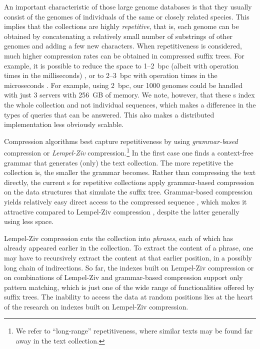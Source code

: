 An important characteristic of those large genome databases is that they
usually consist of the genomes of individuals of the same or closely related
species. This implies that the collections are highly \emph{repetitive}, that
is, each genome can be obtained by concatenating a relatively small number of
substrings of other genomes
and adding a few new characters. When repetitiveness is considered, much higher
compression rates can be obtained in compressed suffix trees. For example, it is possible to reduce
the space to 1--2~bpc (albeit with operation times in the milliseconds)
\cite{Abeliuk2013}, or to 2--3~bpc with operation times in the microseconds
\cite{Navarro2015}. For example, using 2~bpc, our 1000 genomes could be handled
with just 3 servers with 256~GB of memory. We note, however, that these \CST{}s index
the whole collection and not individual sequences, which makes a difference in
the types of queries that can be answered. This also makes a distributed
implementation less obviously scalable.

Compression algorithms best capture repetitiveness by using \emph{grammar-based}
compression or \emph{Lempel-Ziv} compression.\footnote{We refer to ``long-range''
repetitiveness, where similar texts may be found far away in the text
collection.} In the first case \cite{KY00,CLLPPSS05} one finds a context-free
grammar that generates (only) the text collection. The more repetitive the
collection is, the smaller the grammar becomes. Rather than compressing the text directly,
the current \CST{}s for repetitive collections \cite{Abeliuk2013,Navarro2015}
apply grammar-based compression on the data structures that simulate the suffix tree.
Grammar-based compression yields relatively easy direct access to the compressed
sequence \cite{BLRSRW15}, which makes it attractive compared to Lempel-Ziv
compression \cite{ZL77}, despite the latter generally using less space.

Lempel-Ziv compression cuts the collection into \emph{phrases}, each of which
has already appeared earlier in the collection. To extract the content of a phrase, one may have
to recursively extract the content at that earlier position, in a possibly long
chain of indirections.
So far, the indexes built on Lempel-Ziv compression \cite{KN13} or on
combinations of Lempel-Ziv and grammar-based compression \cite{GGKNP12,GGKNP14,GP15}
support only pattern matching, which is just one of the wide range of
functionalities offered by suffix trees. The inability to access the data
at random positions lies at the heart of the research on indexes built on
Lempel-Ziv compression.

